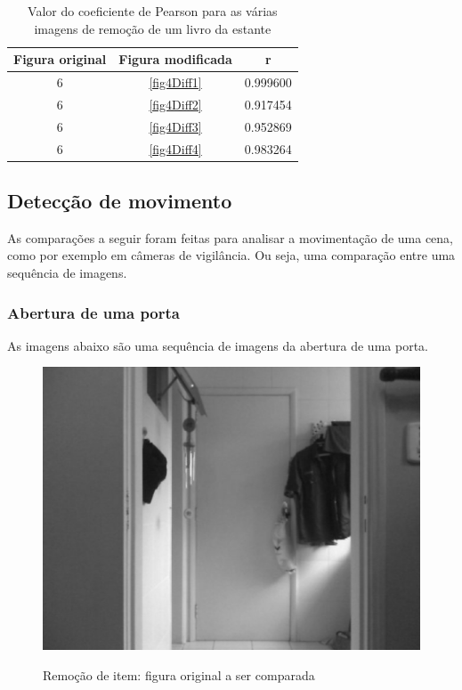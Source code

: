 \documentclass[10pt,a4paper]{article}
\begin{document}
\vspace{-1.0cm}
\begin{table}[h!]
  \begin{center}
    \caption{Valor do coeficiente de Pearson para as várias imagens de
      remoção de um livro da estante}
    \begin{tabular}{|c|c|c|}
      \hline
      Figura original & Figura modificada & r\\
      \hline
      6 &  \ref{fig4Diff1} & 0.999600\\
      6 &  \ref{fig4Diff2} &  0.917454\\
      6 &  \ref{fig4Diff3} &   0.952869\\
      6 &  \ref{fig4Diff4} &   0.983264\\
      \hline
    \end{tabular}\label{tab:livro}
  \end{center}
\end{table}


\newpage
\subsection{Detecção de movimento}
As comparações a seguir foram feitas para analisar a movimentação de uma cena, como por exemplo em câmeras de
vigilância. Ou seja, uma comparação entre uma sequência de imagens.

\subsubsection{Abertura de uma porta}
As imagens abaixo são uma sequência de imagens da
abertura de uma porta.

\begin{figure}[h!]
\begin{center}
\includegraphics[scale=0.35]{photos/porta/gBase} \label{porta}
\caption{Remoção de item: figura original a ser comparada}
\end{center}
\end{figure}
\end{document}
